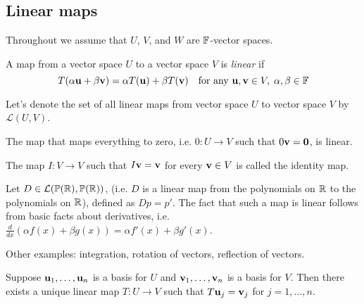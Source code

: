 \documentclass{article}
\begin{document}
\subsection{Linear maps}
\label{sec:lin_maps}
Throughout we assume that $U$, $V$, and $W$ are ${\mathbb{F}}$-vector spaces.

\begin{definition}
A map from a vector space $U$ to a vector space $V$ is \emph{linear} if
\begin{equation*}
    T(\alpha {\mathbf{u}} + \beta {\mathbf{v}}) = \alpha T({\mathbf{u}}) + \beta T({\mathbf{v}}) \quad \text{for any } {\mathbf{u}}, {\mathbf{v}} \in V, \; \alpha, \beta \in {\mathbb{F}}
\end{equation*}
\end{definition}

Let's denote the set of all linear maps from vector space $U$ to vector space $V$ by $\mathcal{L}(U,V)$.

\begin{example}
The map that maps everything to zero, i.e. $0:U \to V$ such that $0 {\mathbf{v}} = {\mathbf{0}}$, is linear. 
\end{example}

\begin{example}
The map $I: V \to V$ such that $I {\mathbf{v}} = {\mathbf{v}}$ for every ${\mathbf{v}} \in V$ is called the identity map. 
\end{example}

\begin{example}
\label{ex:diff_map}
Let $D \in \mathcal{L}(\mathbb{P}({\mathbb{R}}),\mathbb{P}({\mathbb{R}}))$, (i.e. $D$ is a linear map from the polynomials on ${\mathbb{R}}$ to  the polynomials on ${\mathbb{R}}$), defined as $Dp = p'$. The fact that such a map is linear follows from basic facts about derivatives, i.e. $\frac{d}{dx} (\alpha f(x) + \beta g(x)) = \alpha f'(x) + \beta g'(x)$.

\end{example}

Other examples: integration, rotation of vectors, reflection of vectors.

\begin{theorem}
\label{thm:unique_map}
Suppose ${\mathbf{u}}_1, \ldots, {\mathbf{u}}_n$ is a basis for $U$ and ${\mathbf{v}}_1, \ldots, {\mathbf{v}}_n$ is a basis for $V$. Then there exists a unique linear map $T:U \to V$ such that $T {\mathbf{u}}_j = {\mathbf{v}}_j$ for $j=1,\ldots, n$.
\end{theorem}
\end{document}
